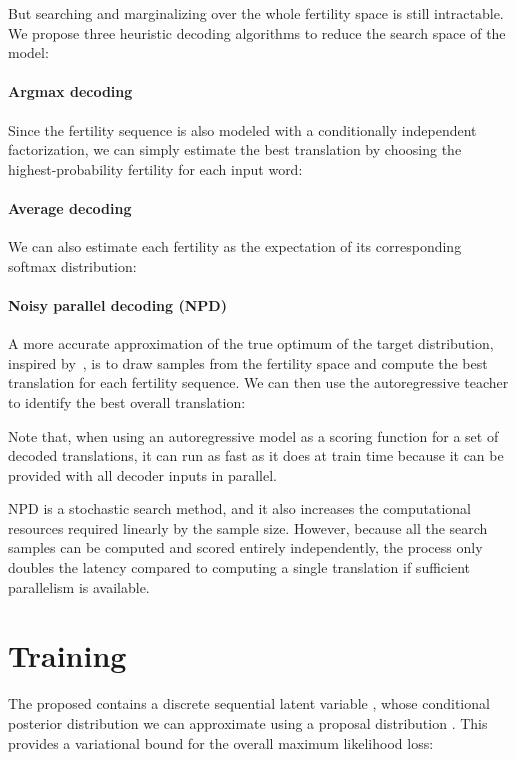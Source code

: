 \documentclass{article} \usepackage{iclr2018_conference,times}
\begin{document}
But searching and marginalizing over the whole fertility space is still intractable. We propose three heuristic decoding algorithms to reduce the search space of the \model{} model:

\vspace{-5pt}
\paragraph{Argmax decoding} Since the fertility sequence is also modeled with a conditionally independent factorization, we can simply estimate the best translation by choosing the highest-probability fertility for each input word:



\vspace{-5pt}
\paragraph{Average decoding}
We can also estimate each fertility as the expectation of its corresponding softmax distribution:


\vspace{-5pt}
\paragraph{Noisy parallel decoding (NPD)} A more accurate approximation of the true optimum of the target distribution, inspired by~\citet{cho2016noisy}, is to draw samples from the fertility space and compute the best translation for each fertility sequence.
We can then use the autoregressive teacher to identify the best overall translation:

Note that, when using an autoregressive model as a scoring function for a set of decoded translations, it can run as fast as it does at train time because it can be provided with all decoder inputs in parallel.

NPD is a stochastic search method, and it also increases the computational resources required linearly by the sample size. However, because all the search samples can be computed and scored entirely independently, the process only doubles the latency compared to computing a single translation if sufficient parallelism is available.


\section{Training}
The proposed \model{} contains a discrete sequential latent variable , whose conditional posterior distribution  we can approximate using a proposal distribution . This provides a variational bound for the overall maximum likelihood loss:
\end{document}
